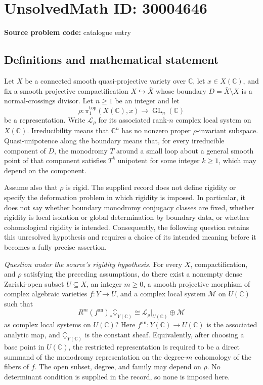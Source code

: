 \documentclass[11pt]{article}
\newcommand{\C}{\mathbb{C}}
\begin{document}
\section*{UnsolvedMath ID: 30004646}
\textbf{Source problem code:} catalogue entry
\subsection{Definitions and mathematical statement}
Let \(X\) be a connected smooth quasi-projective variety over \(\C\), let \(x\in X(\C)\), and fix a smooth projective compactification \(X\hookrightarrow\overline X\) whose boundary \(D=\overline X\setminus X\) is a normal-crossings divisor. Let \(n\geq 1\) be an integer and let
\[
\rho:\pi_1^{\mathrm{top}}(X(\C),x)\longrightarrow\operatorname{GL}_n(\C)
\]
be a representation. Write \(\mathcal L_\rho\) for its associated rank-\(n\) complex local system on \(X(\C)\). Irreducibility means that \(\C^n\) has no nonzero proper \(\rho\)-invariant subspace. Quasi-unipotence along the boundary means that, for every irreducible component of \(D\), the monodromy \(T\) around a small loop about a general smooth point of that component satisfies \(T^k\) unipotent for some integer \(k\geq 1\), which may depend on the component.

Assume also that \(\rho\) is rigid. The supplied record does not define rigidity or specify the deformation problem in which rigidity is imposed. In particular, it does not say whether boundary monodromy conjugacy classes are fixed, whether rigidity is local isolation or global determination by boundary data, or whether cohomological rigidity is intended. Consequently, the following question retains this unresolved hypothesis and requires a choice of its intended meaning before it becomes a fully precise assertion.

\emph{Question under the source's rigidity hypothesis.} For every \(X\), compactification, and \(\rho\) satisfying the preceding assumptions, do there exist a nonempty dense Zariski-open subset \(U\subseteq X\), an integer \(m\geq 0\), a smooth projective morphism of complex algebraic varieties \(f:Y\to U\), and a complex local system \(\mathcal M\) on \(U(\C)\) such that
\[
R^m(f^{\mathrm{an}})_*\underline{\C}_{Y(\C)}
\cong
\mathcal L_\rho|_{U(\C)}\oplus\mathcal M
\]
as complex local systems on \(U(\C)\)? Here \(f^{\mathrm{an}}:Y(\C)\to U(\C)\) is the associated analytic map, and \(\underline{\C}_{Y(\C)}\) is the constant sheaf. Equivalently, after choosing a base point in \(U(\C)\), the restricted representation is required to be a direct summand of the monodromy representation on the degree-\(m\) cohomology of the fibers of \(f\). The open subset, degree, and family may depend on \(\rho\). No determinant condition is supplied in the record, so none is imposed here.
\end{document}
